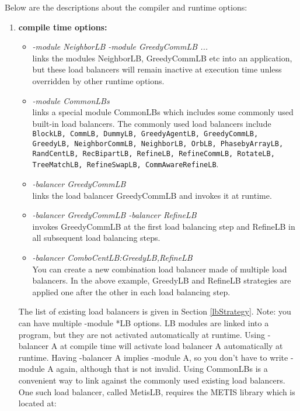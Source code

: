 Below are the descriptions about the compiler and runtime options:

\begin{enumerate}
\item {\bf compile time options:}

\begin{itemize}
\item {\em -module NeighborLB -module GreedyCommLB ...}  \\
  links the modules NeighborLB, GreedyCommLB etc into an application, but these
load balancers will remain inactive at execution time unless overridden by other
runtime options.
\item {\em -module CommonLBs} \\
  links a special module CommonLBs which includes some commonly used \charmpp{}
built-in load balancers. The commonly used load balancers include {\tt
BlockLB, CommLB, DummyLB, GreedyAgentLB, GreedyCommLB, GreedyLB,
NeighborCommLB, NeighborLB, OrbLB, PhasebyArrayLB, RandCentLB,
RecBipartLB, RefineLB, RefineCommLB, RotateLB, TreeMatchLB, RefineSwapLB, CommAwareRefineLB}.
\item {\em -balancer GreedyCommLB} \\
  links the load balancer GreedyCommLB and invokes it at runtime.
\item {\em -balancer GreedyCommLB -balancer RefineLB} \\
  invokes GreedyCommLB at the first load balancing step and RefineLB in all
subsequent load balancing steps.
\item {\em -balancer ComboCentLB:GreedyLB,RefineLB}  \\
  You can create a new combination load balancer made of multiple
load balancers. In the above example, GreedyLB and RefineLB strategies are
applied one after the other in each load balancing step.
\end{itemize}

The list of existing load balancers is given in Section
\ref{lbStrategy}. Note: you can have multiple -module *LB options. LB
modules are linked into a program, but they are not activated
automatically at runtime.  Using -balancer A at compile time will
activate load balancer A automatically at runtime.  Having -balancer A
implies -module A, so you don't have to write -module A again,
although that is not invalid.  Using CommonLBs is a convenient way to
link against the commonly used existing load balancers.  One such load
balancer, called MetisLB, requires the METIS library which is located
at: 


\end{enumerate}
